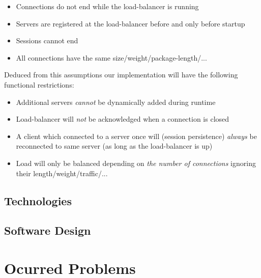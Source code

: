 \documentclass[11pt, a4paper]{article}
\begin{document}
\vspace{-10pt}
\begin{itemize}
	\item Connections do not end while the load-balancer is running
	\item Servers are registered at the load-balancer before and only before startup
	\item Sessions cannot end
	\item All connections have the same size/weight/package-length/...
\end{itemize}
\vspace{-10pt}

Deduced from this assumptions our implementation will have the following functional restrictions:

\vspace{-10pt}
\begin{itemize}
	\item Additional servers \textit{cannot} be dynamically added during runtime
	\item Load-balancer will \textit{not} be acknowledged when a connection is closed
	\item A client which connected to a server once will (session persistence) \textit{always} be reconnected to same server (as long as the load-balancer is up)
	\item Load will only be balanced depending on \textit{the number of connections} ignoring their length/weight/traffic/...
\end{itemize}
\vspace{-10pt}

\subsection{Technologies}

\subsection{Software Design}

\section{Ocurred Problems}


\nocite{*}


\end{document}
